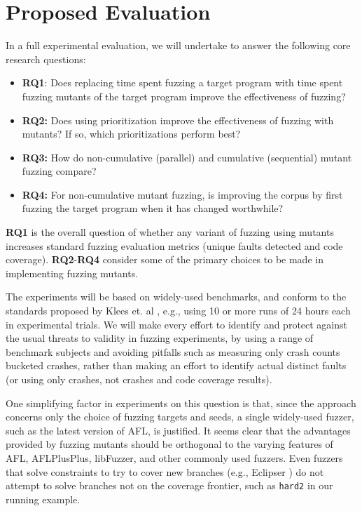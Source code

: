 \section{Proposed Evaluation}

In a full experimental evaluation, we will undertake to answer the following core research questions:

\begin{itemize}
  \item {\bf RQ1}: Does replacing time spent fuzzing a target program with time spent fuzzing mutants of the target program improve
  the effectiveness of fuzzing?
  \item {\bf RQ2:} Does using prioritization improve the effectiveness of fuzzing with mutants?  If so, which prioritizations perform best?
  \item {\bf RQ3:} How do non-cumulative (parallel) and cumulative (sequential) mutant fuzzing compare?
  \item {\bf RQ4:} For non-cumulative mutant fuzzing, is improving the corpus by first fuzzing the target program when it has changed worthwhile?
  \end{itemize}
  
{\bf RQ1} is the overall question of whether any variant of fuzzing using mutants increases standard fuzzing evaluation metrics
(unique faults detected and code coverage).  {\bf RQ2}-{\bf RQ4} consider some of the primary choices to be made in implementing fuzzing mutants.

The experiments will be based on widely-used benchmarks, and conform to the standards proposed by Klees et. al \cite{evalfuzz}, e.g., using 10 or
more runs of 24 hours each in experimental trials.  We will make every effort to identify and protect against the usual threats to validity in fuzzing experiments, by using a range of benchmark subjects and avoiding pitfalls such as measuring only crash counts bucketed crashes, rather than making an effort to identify actual distinct faults \cite{FuzzAppeal} (or using only crashes, not crashes and code coverage results).

One simplifying factor in experiments on this question is that, since the approach concerns
only the choice of fuzzing targets and seeds, a single widely-used fuzzer, such as the latest version of AFL, is justified.  It seems clear that
the advantages provided by fuzzing mutants should be orthogonal to the varying features of AFL, AFLPlusPlus, libFuzzer, and other commonly
used fuzzers.  Even fuzzers that solve constraints to try to cover new branches (e.g., Eclipser \cite{eclipser}) do not attempt to solve branches not on the coverage frontier, such as {\tt hard2} in our running example.

